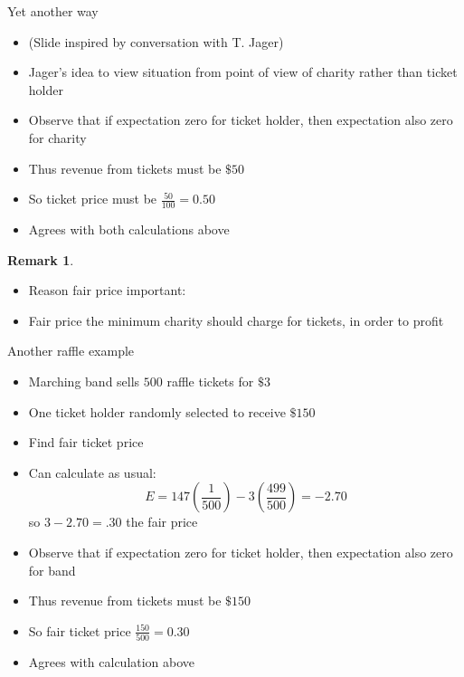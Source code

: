 \documentclass{beamer}
\theoremstyle{definition}
\newtheorem{remark}{Remark}
\begin{document}
\begin{frame}{Yet another way}
\begin{itemize}
\item (Slide inspired by conversation with T. Jager)
\item Jager's idea to view situation from point of view
of charity rather than ticket holder
\item Observe that if expectation zero for ticket holder,
then expectation also zero for charity 
\item Thus revenue from tickets must be $\$50$
\item So ticket price must be $\frac{50}{100}=0.50$
\item Agrees with both calculations above
\end{itemize}
\begin{remark}
\begin{itemize}
\item Reason fair price important:
\item Fair price the \alert{minimum} charity should
charge for tickets, in order to profit
\end{itemize}
\end{remark}
\end{frame}

\begin{frame}{Another raffle example}
\begin{itemize}
\item Marching band sells $500$ raffle tickets for $\$3$
\item One ticket holder randomly selected to receive $\$150$
\item Find fair ticket price
\item Can calculate as usual:
\[E=147\left(\frac{1}{500}\right)-3\left(\frac{499}{500}\right)=-2.70\]
so $3-2.70=.30$ the fair price
\item Observe that if expectation zero for ticket holder,
then expectation also zero for band
\item Thus revenue from tickets must be $\$150$
\item So fair ticket price $\frac{150}{500}=0.30$
\item Agrees with calculation above
\end{itemize}
\end{frame}
\end{document}
